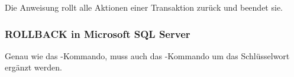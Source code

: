 \begin{merke}
    Die Anweisung \ROLLBACK{} rollt alle Aktionen einer Transaktion
    zurück und beendet sie.
\end{merke}
\clearpage
\subsubsection{ROLLBACK in Microsoft SQL Server}
Genau wie das \COMMIT-Kommando, muss auch das \ROLLBACK-Kommando um
das Schlüsselwort  ergänzt werden.

